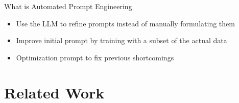 \documentclass{sdqbeamer}
\begin{document}
\begin{frame}[picture 66 vertical, picture=images/iterative_core_loop.pdf]{What is Automated Prompt Engineering}
    \begin{itemize}
        \item Use the LLM to refine prompts instead of manually formulating them
        \item Improve initial prompt by training with a subset of the actual data
        \item Optimization prompt to fix previous shortcomings
    \end{itemize}
\end{frame}

\begin{comment}
\begin{frame}
\frametitle{The LiSSA Framework}
    \begin{figure}
        \centering
        \texttt{[image: images/LiSSA\_pipeline\_Fuchß.png]}
        \caption{LiSSA pipeline by \cite{fuchss2025LiSSAGeneric}}
        \label{fig:enter-label}
    \end{figure}
    \begin{itemize}
        \item This work will add to the prompting step of the LiSSA framework
    \end{itemize}
    
\end{frame}
\end{comment}

\section{Related Work}
\end{document}
